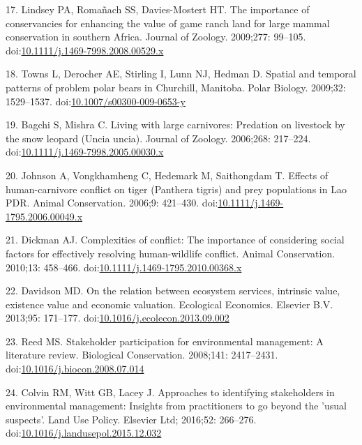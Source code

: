 \documentclass[10pt,letterpaper]{article}
\begin{document}
\hypertarget{ref-Lindsey2009}{}
17. Lindsey PA, Romañach SS, Davies-Mostert HT. The importance of
conservancies for enhancing the value of game ranch land for large
mammal conservation in southern Africa. Journal of Zoology. 2009;277:
99--105.
doi:\href{https://doi.org/10.1111/j.1469-7998.2008.00529.x}{10.1111/j.1469-7998.2008.00529.x}

\hypertarget{ref-Towns2009}{}
18. Towns L, Derocher AE, Stirling I, Lunn NJ, Hedman D. Spatial and
temporal patterns of problem polar bears in Churchill, Manitoba. Polar
Biology. 2009;32: 1529--1537.
doi:\href{https://doi.org/10.1007/s00300-009-0653-y}{10.1007/s00300-009-0653-y}

\hypertarget{ref-Bagchi2006}{}
19. Bagchi S, Mishra C. Living with large carnivores: Predation on
livestock by the snow leopard (Uncia uncia). Journal of Zoology.
2006;268: 217--224.
doi:\href{https://doi.org/10.1111/j.1469-7998.2005.00030.x}{10.1111/j.1469-7998.2005.00030.x}

\hypertarget{ref-Johnson2006}{}
20. Johnson A, Vongkhamheng C, Hedemark M, Saithongdam T. Effects of
human-carnivore conflict on tiger (Panthera tigris) and prey populations
in Lao PDR. Animal Conservation. 2006;9: 421--430.
doi:\href{https://doi.org/10.1111/j.1469-1795.2006.00049.x}{10.1111/j.1469-1795.2006.00049.x}

\hypertarget{ref-Dickman2010}{}
21. Dickman AJ. Complexities of conflict: The importance of considering
social factors for effectively resolving human-wildlife conflict. Animal
Conservation. 2010;13: 458--466.
doi:\href{https://doi.org/10.1111/j.1469-1795.2010.00368.x}{10.1111/j.1469-1795.2010.00368.x}

\hypertarget{ref-Davidson2013}{}
22. Davidson MD. On the relation between ecosystem services, intrinsic
value, existence value and economic valuation. Ecological Economics.
Elsevier B.V. 2013;95: 171--177.
doi:\href{https://doi.org/10.1016/j.ecolecon.2013.09.002}{10.1016/j.ecolecon.2013.09.002}

\hypertarget{ref-Reed2008}{}
23. Reed MS. Stakeholder participation for environmental management: A
literature review. Biological Conservation. 2008;141: 2417--2431.
doi:\href{https://doi.org/10.1016/j.biocon.2008.07.014}{10.1016/j.biocon.2008.07.014}

\hypertarget{ref-Colvin2016}{}
24. Colvin RM, Witt GB, Lacey J. Approaches to identifying stakeholders
in environmental management: Insights from practitioners to go beyond
the 'usual suspects'. Land Use Policy. Elsevier Ltd; 2016;52: 266--276.
doi:\href{https://doi.org/10.1016/j.landusepol.2015.12.032}{10.1016/j.landusepol.2015.12.032}
\end{document}
